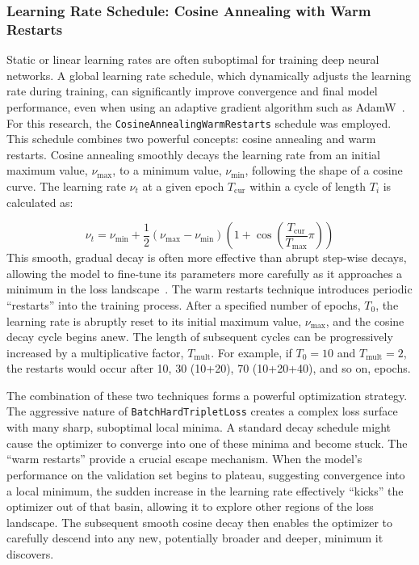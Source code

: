\subsubsection{Learning Rate Schedule: Cosine Annealing with Warm Restarts}
Static or linear learning rates are often suboptimal for training deep neural networks. A global learning rate schedule, which dynamically adjusts the learning rate during training, can significantly improve convergence and final model performance, even when using an adaptive gradient algorithm such as AdamW~\cite{loshchilov2019decoupledweightdecayregularization}. For this research, the \verb|CosineAnnealingWarmRestarts| schedule was employed. This schedule combines two powerful concepts: cosine annealing and warm restarts. Cosine annealing smoothly decays the learning rate from an initial maximum value, \(\nu_{\textrm{max}}\), to a minimum value, \(\nu_{\textrm{min}}\), following the shape of a cosine curve. The learning rate \(\nu_t\) at a given epoch \(T_{\textrm{cur}}\) within a cycle of length \(T_i\) is calculated as:{\setlength{\emergencystretch}{5em}\par}
\[ \nu_t = \nu_{\textrm{min}} + \frac{1}{2}\left( \nu_{\textrm{max}} -\nu_{\textrm{min}} \right)\left(1 + \cos\left(\frac{T_{\textrm{cur}}}{T_{\textrm{max}}}\pi\right)\right) \]
This smooth, gradual decay is often more effective than abrupt step-wise decays, allowing the model to fine-tune its parameters more carefully as it approaches a minimum in the loss landscape~\cite{pytorchcosanneal}.  The warm restarts technique introduces periodic ``restarts'' into the training process. After a specified number of epochs, \(T_0\), the learning rate is abruptly reset to its initial maximum value, \(\nu_{\textrm{max}}\), and the cosine decay cycle begins anew. The length of subsequent cycles can be progressively increased by a multiplicative factor, \(T_{\textrm{mult}}\).  For example, if \(T_0 = 10\) and \(T_{\textrm{mult}}=2\), the restarts would occur after 10, 30 (10+20), 70 (10+20+40), and so on, epochs.

The combination of these two techniques forms a powerful optimization strategy. The aggressive nature of \verb|BatchHardTripletLoss| creates a complex loss surface with many sharp, suboptimal local minima. A standard decay schedule might cause the optimizer to converge into one of these minima and become stuck. The ``warm restarts'' provide a crucial escape mechanism. When the model's performance on the validation set begins to plateau, suggesting convergence into a local minimum, the sudden increase in the learning rate effectively ``kicks'' the optimizer out of that basin, allowing it to explore other regions of the loss landscape. The subsequent smooth cosine decay then enables the optimizer to carefully descend into any new, potentially broader and deeper, minimum it discovers.

